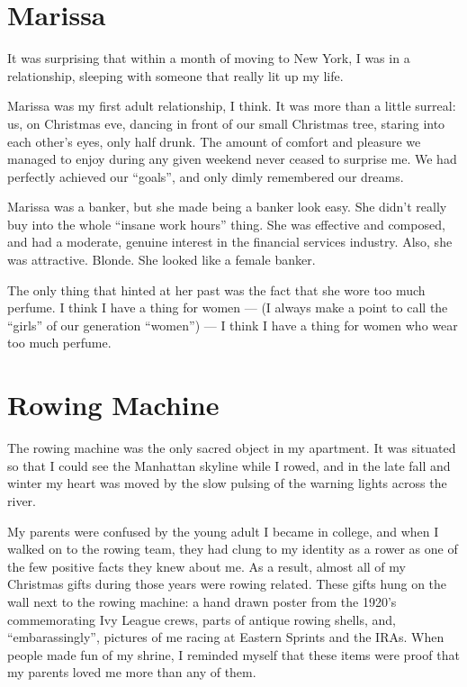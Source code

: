 \documentclass[12pt]{article}
\begin{document}
\section{Marissa}
It was surprising that within a month of moving to New York, I was
in a relationship, sleeping with someone that really lit up my life.

Marissa was my first adult relationship, I think.  It was more than a
little surreal: us, on Christmas eve, dancing in front of our small
Christmas tree, staring into each other's eyes, only half drunk.  The
amount of comfort and pleasure we managed to enjoy during any given weekend
never ceased to surprise me.  We had perfectly
achieved our ``goals'', and only dimly remembered our dreams.

Marissa was a banker, but she made being a banker look easy.  She didn't really
buy into the whole ``insane work hours'' thing.  She was effective and composed,
and had a moderate, genuine interest in the financial services industry.  Also,
she was attractive.  Blonde.  She looked like a female banker. 

The only thing that hinted at her past was the fact that she wore too
much perfume.  I think I have a thing for women --- (I always make a point
to call the ``girls'' of our generation ``women'') --- I think I have a thing
for women who wear too much perfume.

\section{Rowing Machine}
The rowing machine was the only sacred object in my apartment.  It
was situated so that I could see the Manhattan skyline while I
rowed, and in the late fall and winter my heart was moved by the slow
pulsing of the warning lights across the river.

My parents were confused by the young adult I became in college, and
when I walked on to the rowing team, they had clung to my identity
as a rower as one of the few positive facts they knew about me.  As
a result, almost all of my Christmas gifts during those years were
rowing related.  These gifts hung on the wall next to the rowing
machine: a hand drawn poster from the 1920's commemorating Ivy
League crews, parts of antique rowing shells, and, ``embarassingly'',
pictures of me racing at Eastern Sprints and the IRAs.  When people
made fun of my shrine, I reminded myself that these items were proof
that my parents loved me more than any of them.
\end{document}
